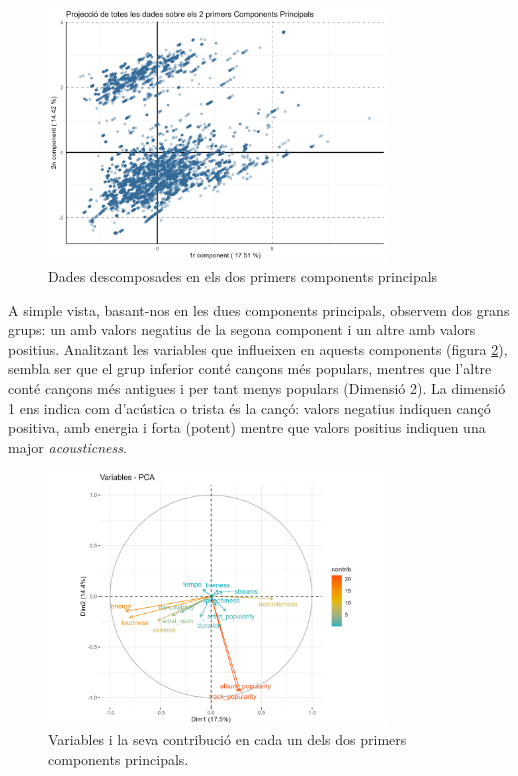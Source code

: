 \begin{figure}[H]
    \centering
    \includegraphics[width=0.8\textwidth]{Images/4_clustering/DBSCAN/dbscanpca.png}
    \caption{Dades descomposades en els dos primers components principals}
    \label{fig:DBSCAN_pca}
\end{figure}

A simple vista, basant-nos en les dues components principals, observem dos grans grups: un amb valors negatius de la segona component i un altre amb valors positius. Analitzant les variables que influeixen en aquests components (figura \ref{fig:DBSCAN_pca_contrib}), sembla ser que el grup inferior conté cançons més populars, mentres que l'altre conté cançons més antigues i per tant menys populars (Dimensió 2). La dimensió 1 ens indica com d'acústica o trista és la cançó: valors negatius indiquen cançó positiva, amb energia i forta (potent) mentre que valors positius indiquen una major \textit{acousticness}.

\begin{figure}[H]
    \centering
    \includegraphics[width=0.8\textwidth]{Images/4_clustering/DBSCAN/dbscanpcacomponents.png}
    \caption{Variables i la seva contribució en cada un dels dos primers components principals.}
    \label{fig:DBSCAN_pca_contrib}
\end{figure}

